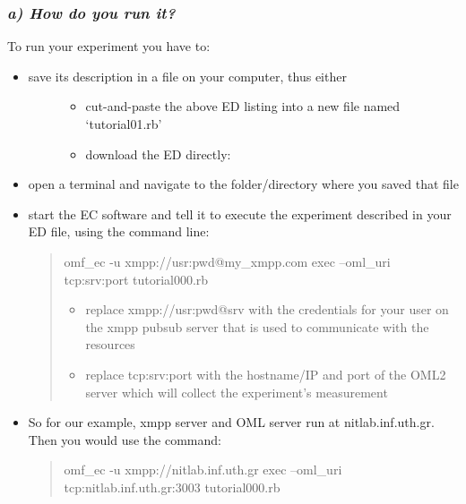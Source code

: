 \documentclass[letterpaper,10pt,english]{sphinxmanual}
\begin{document}
\subsubsection{\emph{a) How do you run it?}}
\label{wireless_example:a-how-do-you-run-it}
To run your experiment you have to:
\begin{itemize}
\item {} \begin{description}
\item[{save its description in a file on your computer, thus either}] \leavevmode\begin{itemize}
\item {} 
cut-and-paste the above ED listing into a new file named `tutorial01.rb'

\item {} 
download the ED directly: 

\end{itemize}

\end{description}

\item {} 
open a terminal and navigate to the folder/directory where you saved that file

\item {} 
start the EC software and tell it to execute the experiment described in your ED file, using the command line:
\begin{quote}

omf\_ec -u xmpp://usr:pwd@my\_xmpp.com exec --oml\_uri tcp:srv:port tutorial000.rb
\begin{itemize}
\item {} 
replace xmpp://usr:pwd@srv with the credentials for your user on the xmpp pubsub server that is used to communicate with the resources

\item {} 
replace tcp:srv:port with the hostname/IP and port of the OML2 server which will collect the experiment's measurement

\end{itemize}
\end{quote}

\item {} 
So for our example, xmpp server and OML server run at nitlab.inf.uth.gr. Then you would use the command:
\begin{quote}

omf\_ec -u xmpp://nitlab.inf.uth.gr exec --oml\_uri tcp:nitlab.inf.uth.gr:3003 tutorial000.rb
\end{quote}

\end{itemize}
\end{document}
